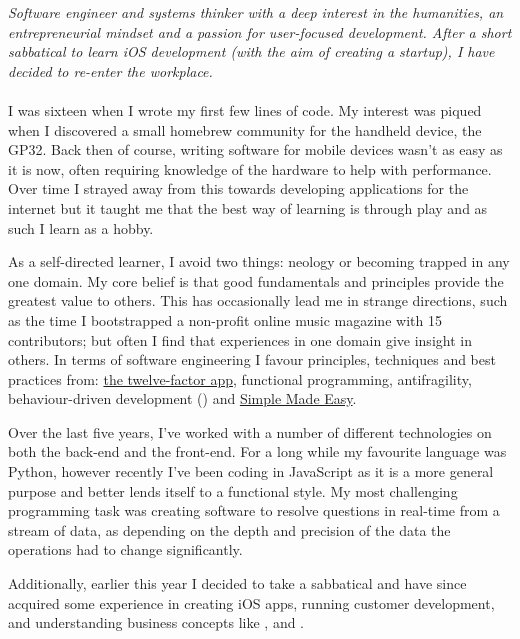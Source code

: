 \documentclass[10pt,a4paper]{article}
\begin{document}
\vspace{-1.3em}  %
\begin{multicols}{2}  %
\noindent \emph{Software engineer and systems thinker with a deep interest in the humanities, an entrepreneurial mindset and a passion for user-focused development. After a short sabbatical to learn iOS development (with the aim of creating a startup), I have decided to re-enter the workplace.}
\\
\\
I was sixteen when I wrote my first few lines of code. My interest was piqued when I discovered a small homebrew community for the handheld device, the GP32. Back then of course, writing software for mobile devices wasn't as easy as it is now, often requiring knowledge of the hardware to help with performance. Over time I strayed away from this towards developing applications for the internet but it taught me that the best way of learning is through play and as such I learn as a hobby.\newline

As a self-directed learner, I avoid two things: neology or becoming trapped in any one domain. My core belief is that good fundamentals and principles provide the greatest value to others. This has occasionally lead me in strange directions, such as the time I bootstrapped a non-profit online music magazine with 15 contributors; but often I find that experiences in one domain give insight in others. In terms of software engineering I favour principles, techniques and best practices from: \href{http://12factor.net}{the twelve-factor app}, functional programming, antifragility, behaviour-driven development () and \href{http://infoq.com/presentations/Simple-Made-Easy}{Simple Made Easy}.\newline

Over the last five years, I've worked with a number of different technologies on both the back-end and the front-end. For a long while my favourite language was Python, however recently I've been coding in JavaScript as it is a more general purpose and better lends itself to a functional style. My most challenging programming task was creating software to resolve questions in real-time from a stream of data, as depending on the depth and precision of the data the operations had to change significantly.\newline

Additionally, earlier this year I decided to take a sabbatical and have since acquired some experience in creating iOS apps, running customer development, and understanding business concepts like ,  and . 

\end{multicols}
\end{document}
